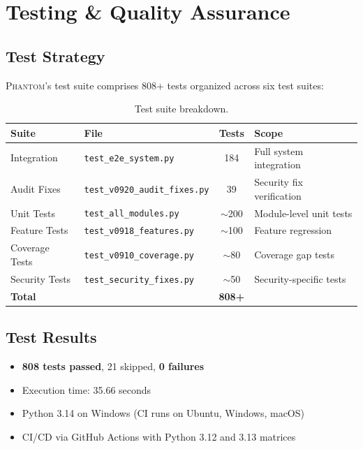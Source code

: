 \documentclass[12pt,a4paper,twoside]{report}
\makeatletter
\newcommand{\phantom@}{\textsc{Phantom}}
\makeatother
\begin{document}
\chapter{Testing \& Quality Assurance}
\label{ch:testing}

\section{Test Strategy}

\phantom@{}'s test suite comprises 808+ tests organized across six test suites:

\begin{table}[H]
\centering
\caption{Test suite breakdown.}
\label{tab:tests}
\begin{tabularx}{\textwidth}{llcX}
\toprule
\textbf{Suite} & \textbf{File} & \textbf{Tests} & \textbf{Scope} \\
\midrule
Integration     & \texttt{test\_e2e\_system.py}         & 184  & Full system integration \\
Audit Fixes     & \texttt{test\_v0920\_audit\_fixes.py}  & 39   & Security fix verification \\
Unit Tests      & \texttt{test\_all\_modules.py}         & $\sim$200  & Module-level unit tests \\
Feature Tests   & \texttt{test\_v0918\_features.py}      & $\sim$100  & Feature regression \\
Coverage Tests  & \texttt{test\_v0910\_coverage.py}      & $\sim$80   & Coverage gap tests \\
Security Tests  & \texttt{test\_security\_fixes.py}      & $\sim$50   & Security-specific tests \\
\midrule
\textbf{Total}  &                                        & \textbf{808+} & \\
\bottomrule
\end{tabularx}
\end{table}

\section{Test Results}

\begin{successbox}
\begin{itemize}
    \item \textbf{808 tests passed}, 21 skipped, \textbf{0 failures}
    \item Execution time: 35.66 seconds
    \item Python 3.14 on Windows (CI runs on Ubuntu, Windows, macOS)
    \item CI/CD via GitHub Actions with Python 3.12 and 3.13 matrices
\end{itemize}
\end{successbox}
\end{document}
